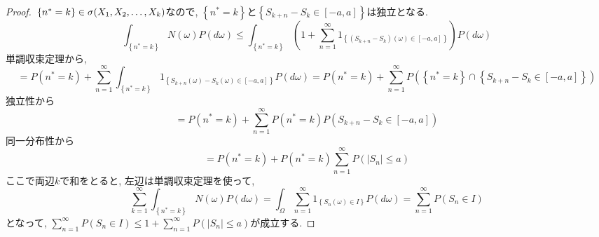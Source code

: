 \documentclass{jsarticle}
\begin{document}
\begin{proof}
$\\ \left\{ n^{*} = k \right\} \in \sigma (X_{1}, X_{2}, \dots, X_{k}) $なので, $\left\{ n^{*} = k \right\}$と$\left\{ S_{k+n} - S_{k} \in [-a,a] \right\}$は独立となる.
$$\int_{ \left\{ n^{*} = k \right\} }{N(\omega) P (d\omega)} \le \int_{ \left\{ n^{*} = k \right\} } { \left( 1 + \sum_{n=1}^{\infty} 1_{ \left\{ (S_{k+n} - S_{k})(\omega) \in \left[-a,a\right] \right\}  } \right) P (d\omega) } $$ 単調収束定理から, 
$$ = P( n^{*} = k ) + \sum_{n=1}^{\infty} \int_{ \left\{ n^{*} = k \right\} } {1_{ \left\{ S_{k+n}(\omega) - S_{k}(\omega) \in \left[-a,a\right] \right\}  } P (d\omega) } = P( n^{*} = k ) + \sum_{n=1}^{\infty} P\left( \left\{ n^{*}=k \right\} \cap  \left\{ S_{k+n} - S_{k} \in \left[-a,a\right] \right\}  \right) $$ 
独立性から
$$=  P( n^{*} = k ) +  \sum_{n=1}^{\infty} P(n^{*} = k) P (S_{k+n} - S_{k} \in \left[-a,a\right])$$ 
同一分布性から 
$$ = P( n^{*} = k ) + P(n^{*} = k) \sum_{n=1}^{\infty} P ( \left| S_{n} \right| \le a)$$ ここで両辺$k$で和をとると, 左辺は単調収束定理を使って,
$$ \sum_{k=1}^{\infty} \int_{ \left\{ n^{*} = k \right\} }{N(\omega) P (d\omega)} = \int_{ \Omega }{\sum_{n=1}^{\infty} 1_{ \left\{ S_{n}(\omega) \in I \right\} } P (d\omega)} = \sum_{n=1}^{\infty} P(S_{n} \in I )$$
となって, $\displaystyle \sum_{n=1}^{\infty} P(S_{n} \in I ) \le 1 + \sum_{n=1}^{\infty} P ( \left| S_{n} \right| \le a)$が成立する.
\end{proof}
 
\end{document}
